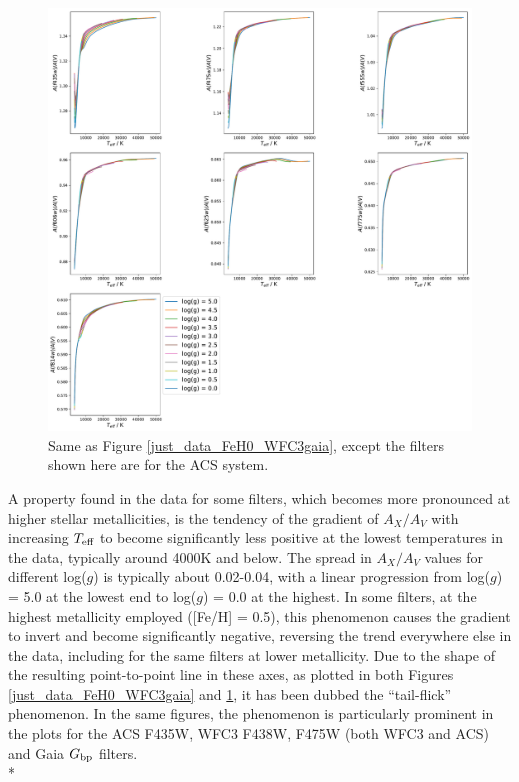 \documentclass[12pt, a4paper]{report}
\begin{document}
\begin{figure}[h!]
\begin{center}
\includegraphics[width=1.0\textwidth]{../just_full_data/ACS/AHub_FeH0p0_just_Teff_plot_lines.pdf}
\caption{Same as Figure \ref{just_data_FeH0_WFC3gaia}, except the filters shown here are for the ACS system.}
\label{just_data_FeH0_ACS}
\end{center}
\end{figure}

A property found in the data for some filters, which becomes more pronounced at higher stellar metallicities, is the tendency of the gradient of $A_{X}/A_{V}$ with increasing $T_{\textnormal{eff}}$ to become significantly less positive at the lowest temperatures in the data, typically around 4000K and below. The spread in $A_{X}/A_{V}$ values for different log($g$) is typically about 0.02-0.04, with a linear progression from log($g$) = 5.0 at the lowest end to log($g$) = 0.0 at the highest. In some filters, at the highest metallicity employed ([Fe/H] = 0.5), this phenomenon causes the gradient to invert and become significantly negative, reversing the trend everywhere else in the data, including for the same filters at lower metallicity. Due to the shape of the resulting point-to-point line in these axes, as plotted in both Figures \ref{just_data_FeH0_WFC3gaia} and \ref{just_data_FeH0_ACS}, it has been dubbed the ``tail-flick'' phenomenon. In the same figures, the phenomenon is particularly prominent in the plots for the ACS F435W, WFC3 F438W, F475W (both WFC3 and ACS) and Gaia $G_{\textnormal{bp}}$ filters.\\*
\end{document}

